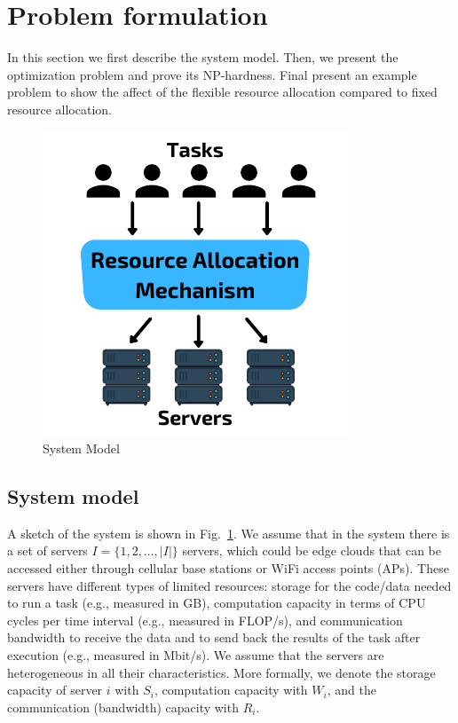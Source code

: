 \section{Problem formulation}\label{sec:problem-formulation}
In this section we first describe the system model. Then, we present the optimization problem and prove its NP-hardness.
Final present an example problem to show the affect of the flexible resource allocation compared to fixed resource
allocation.

\begin{figure}[ht]
    \centering
    \includegraphics[width=0.6\linewidth]{fig/system_model.pdf}
    \caption{System Model}
    \label{fig:system_model}
\end{figure}

\subsection{System model}\label{subsec:system-model}
A sketch of the system is shown in Fig.~\ref{fig:system_model}.
We assume that in the system there is a set of servers $I = \{1,2,\ldots,\left|I\right|\}$ servers, which could be edge
clouds that can be accessed either through cellular base stations or WiFi access points (APs). These servers have
different types of limited resources: storage for the code/data needed to run a task (e.g., measured in GB),
computation capacity in terms of CPU cycles per time interval (e.g., measured in FLOP/s), and communication bandwidth
to receive the data and to send back the results of the task after execution (e.g., measured in Mbit/s). We assume
that the servers are heterogeneous in all their characteristics. More formally, we denote the storage capacity of
server $i$ with $S_i$, computation capacity with $W_i$, and the communication (bandwidth) capacity with $R_i$.

